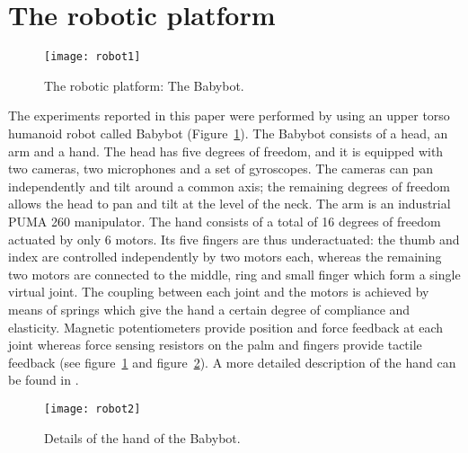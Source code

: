\section{The robotic platform}
\label{sect:robot}

\begin{figure}
\centering
\texttt{[image: robot1]}
\caption{The robotic platform: The Babybot.}
\label{fig-platform}
\end{figure}

The experiments reported in this paper were performed by using an upper torso humanoid robot called Babybot (Figure~\ref{fig-platform}). The Babybot consists of a head, an arm and a hand. The head has five degrees of freedom, and it is equipped with two cameras, two microphones and a set of gyroscopes. The cameras can pan independently and tilt around a common axis; the remaining degrees of freedom allows the head to pan and tilt at the level of the neck. The arm is an industrial PUMA 260 manipulator. The hand consists of a total of 16 degrees of freedom actuated by only 6 motors. Its five fingers are thus underactuated: the thumb and index are controlled independently by two motors each, whereas the remaining two motors are connected to the middle, ring and small finger which form a single virtual joint. The coupling between each joint and the motors is achieved by means of springs which give the hand a certain degree of compliance and elasticity. Magnetic potentiometers provide position and force feedback at each joint whereas force sensing resistors on the palm and fingers provide tactile feedback (see figure~\ref{fig-platform} and figure~\ref{fig-platform2}). A more detailed description of the hand can be found in \cite{natale04thesis}.

\begin{figure}
\centering
\texttt{[image: robot2]}
\caption{Details of the hand of the Babybot.}
\label{fig-platform2}
\end{figure}

